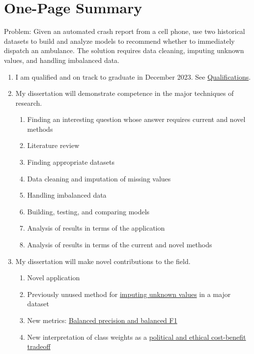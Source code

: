 \section*{One-Page Summary}

Problem:  Given an automated crash report from a cell phone, use two historical datasets to build and analyze models to recommend whether to immediately dispatch an ambulance.  The solution requires data cleaning, imputing unknown values, and handling imbalanced data.

\begin{enumerate}
	\item I am qualified and on track to graduate in December 2023.  See \hyperref[sec:Qualifications]{Qualifications}.
	
	\item My dissertation will demonstrate competence in the major techniques of research.
	\begin{enumerate}[label=\alph*., partopsep=0pt,topsep=0pt,parsep=0pt]
		\item Finding an interesting question whose answer requires current and novel methods
		\item Literature review
		\item Finding appropriate datasets
		\item Data cleaning and imputation of missing values
		\item Handling imbalanced data
		\item Building, testing, and comparing models
		\item Analysis of results in terms of the application
		\item Analysis of results in terms of the current and novel methods
	\end{enumerate}
	
	\item My dissertation will make novel contributions to the field.
	\begin{enumerate}[label=\alph*., partopsep=0pt,topsep=0pt,parsep=0pt]
		\item Novel application
		\item Previously unused method for 
		\hyperref[sec:CRSS_Imputing]{imputing unknown values} in a major dataset
		\item New metrics:  
		\hyperref[sec:Balanced_Metrics]{Balanced precision and balanced F1}
		\item New interpretation of class weights as a 
		\hyperref[sec:Ethical_Tradeoff]{political and ethical cost-benefit tradeoff}	
	\end{enumerate}
	

\end{enumerate}

